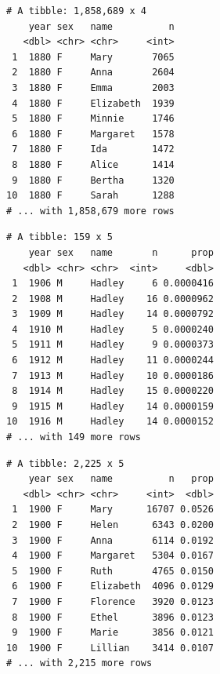 \documentclass[]{book}
\newenvironment{Shaded}{\begin{snugshade}}{\end{snugshade}}
\newcommand{\CommentTok}[1]{\textcolor[rgb]{0.56,0.35,0.01}{\textit{#1}}}
\newcommand{\DecValTok}[1]{\textcolor[rgb]{0.00,0.00,0.81}{#1}}
\newcommand{\KeywordTok}[1]{\textcolor[rgb]{0.13,0.29,0.53}{\textbf{#1}}}
\newcommand{\NormalTok}[1]{#1}
\newcommand{\OperatorTok}[1]{\textcolor[rgb]{0.81,0.36,0.00}{\textbf{#1}}}
\newcommand{\StringTok}[1]{\textcolor[rgb]{0.31,0.60,0.02}{#1}}
\theoremstyle{definition}
\theoremstyle{definition}
\theoremstyle{definition}
\theoremstyle{remark}
\begin{document}
\begin{verbatim}
# A tibble: 1,858,689 x 4
    year sex   name          n
   <dbl> <chr> <chr>     <int>
 1  1880 F     Mary       7065
 2  1880 F     Anna       2604
 3  1880 F     Emma       2003
 4  1880 F     Elizabeth  1939
 5  1880 F     Minnie     1746
 6  1880 F     Margaret   1578
 7  1880 F     Ida        1472
 8  1880 F     Alice      1414
 9  1880 F     Bertha     1320
10  1880 F     Sarah      1288
# ... with 1,858,679 more rows
\end{verbatim}

\begin{Shaded}
\end{Shaded}

\begin{verbatim}
# A tibble: 159 x 5
    year sex   name       n      prop
   <dbl> <chr> <chr>  <int>     <dbl>
 1  1906 M     Hadley     6 0.0000416
 2  1908 M     Hadley    16 0.0000962
 3  1909 M     Hadley    14 0.0000792
 4  1910 M     Hadley     5 0.0000240
 5  1911 M     Hadley     9 0.0000373
 6  1912 M     Hadley    11 0.0000244
 7  1913 M     Hadley    10 0.0000186
 8  1914 M     Hadley    15 0.0000220
 9  1915 M     Hadley    14 0.0000159
10  1916 M     Hadley    14 0.0000152
# ... with 149 more rows
\end{verbatim}

\begin{Shaded}
\end{Shaded}

\begin{verbatim}
# A tibble: 2,225 x 5
    year sex   name          n   prop
   <dbl> <chr> <chr>     <int>  <dbl>
 1  1900 F     Mary      16707 0.0526
 2  1900 F     Helen      6343 0.0200
 3  1900 F     Anna       6114 0.0192
 4  1900 F     Margaret   5304 0.0167
 5  1900 F     Ruth       4765 0.0150
 6  1900 F     Elizabeth  4096 0.0129
 7  1900 F     Florence   3920 0.0123
 8  1900 F     Ethel      3896 0.0123
 9  1900 F     Marie      3856 0.0121
10  1900 F     Lillian    3414 0.0107
# ... with 2,215 more rows
\end{verbatim}
\end{document}
